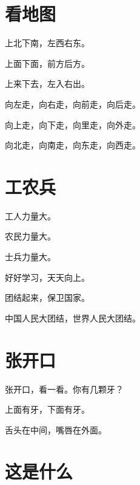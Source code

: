 \documentclass[12pt,UTF-8,openany]{ctexbook}
\begin{document}
\chapter{看地图}

\begin{large}
    
    上北下南，左西右东。
    
    上面下面，前方后方。
    
    上来下去，左入右出。
    
    向左走，向右走，向前走，向后走。
    
    向上走，向下走，向里走，向外走。
    
    向北走，向南走，向东走，向西走。
    
\end{large}





\chapter{工农兵}

\begin{large}
    
    工人力量大。
    
    农民力量大。
    
    士兵力量大。
    
    好好学习，天天向上。
    
    团结起来，保卫国家。
    
    中国人民大团结，世界人民大团结。
    
\end{large}





\chapter{张开口}

\begin{large}
    
    张开口，看一看。你有几颗牙？
    
    上面有牙，下面有牙。
    
    舌头在中间，嘴唇在外面。
    
\end{large}





\chapter{这是什么}
\end{document}
